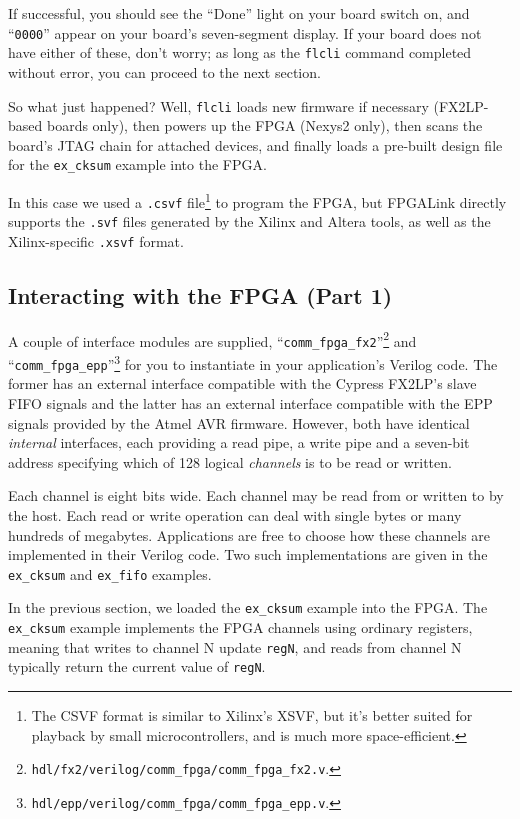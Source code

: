 If successful, you should see the ``Done'' light on your board switch on, and ``\texttt{0000}'' appear on your board's seven-segment display. If your board does not have either of these, don't worry; as long as the \texttt{flcli} command completed without error, you can proceed to the next section.

So what just happened? Well, \texttt{flcli} loads new firmware if necessary (FX2LP-based boards only), then powers up the FPGA (Nexys2 only), then scans the board's JTAG chain for attached devices, and finally loads a pre-built design file for the \texttt{ex\_cksum} example into the FPGA.

In this case we used a \texttt{.csvf} file\footnote{The CSVF format is similar to Xilinx's XSVF, but it's better suited for playback by small microcontrollers, and is much more space-efficient.} to program the FPGA, but FPGALink directly supports the \texttt{.svf} files generated by the Xilinx and Altera tools, as well as the Xilinx-specific \texttt{.xsvf} format.

\newpage
\subsection{Interacting with the FPGA (Part 1)}
A couple of interface modules are supplied, ``\texttt{comm\_fpga\_fx2}''\footnote{\texttt{hdl/fx2/verilog/comm\_fpga/comm\_fpga\_fx2.v}.} and ``\texttt{comm\_fpga\_epp}''\footnote{\texttt{hdl/epp/verilog/comm\_fpga/comm\_fpga\_epp.v}.} for you to instantiate in your application's Verilog code. The former has an external interface compatible with the Cypress FX2LP's slave FIFO signals and the latter has an external interface compatible with the EPP signals provided by the Atmel AVR firmware. However, both have identical \textit{internal} interfaces, each providing a read pipe, a write pipe and a seven-bit address specifying which of 128 logical \textit{channels} is to be read or written.


Each channel is eight bits wide. Each channel may be read from or written to by the host. Each read or write operation can deal with single bytes or many hundreds of megabytes. Applications are free to choose how these channels are implemented in their Verilog code. Two such implementations are given in the \texttt{ex\_cksum} and \texttt{ex\_fifo} examples.

In the previous section, we loaded the \texttt{ex\_cksum} example into the FPGA. The \texttt{ex\_cksum} example implements the FPGA channels using ordinary registers, meaning that writes to channel N update \texttt{regN}, and reads from channel N typically return the current value of \texttt{regN}.

